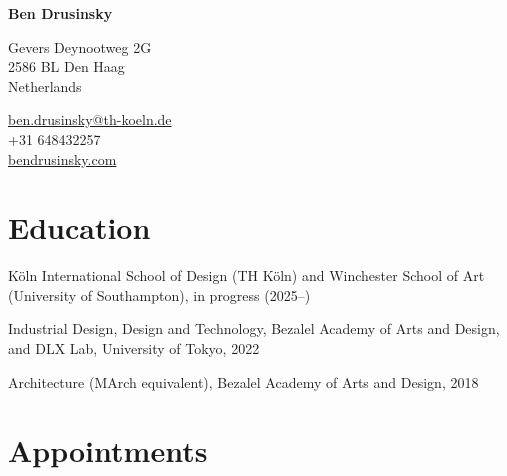 \documentclass[11pt,letterpaper]{report} %
\newcommand{\myname}{Ben Drusinsky}
\newcommand{\namefont}[1]{{\normalfont\bfseries\Huge{#1}}}
\begin{document}
\raggedright{}

\namefont{\myname}

\vspace{1em}
\begin{minipage}[t]{0.700\textwidth}
  Gevers Deynootweg 2G \\
  2586 BL Den Haag \\
  Netherlands
\end{minipage}
\begin{minipage}[t]{0.295\textwidth}
  \raggedleft{}
  \href{mailto:ben.drusinsky@th-koeln.de}{ben.drusinsky@th-koeln.de} \\
  +31 648432257 \\
  \href{https://bendrusinsky.com}{bendrusinsky.com}
\end{minipage}

\section*{Education}

\begin{tablist}

\item[PhD]   \tab{}Köln International School of Design (TH Köln) and Winchester School of Art (University of Southampton), in progress (2025--)
\item[MDes]  \tab{}Industrial Design, Design and Technology, Bezalel Academy of Arts and Design, and DLX Lab, University of Tokyo, 2022
\item[BArch] \tab{}Architecture (MArch equivalent), Bezalel Academy of Arts and Design, 2018

\end{tablist}

\section*{Appointments}
\end{document}
